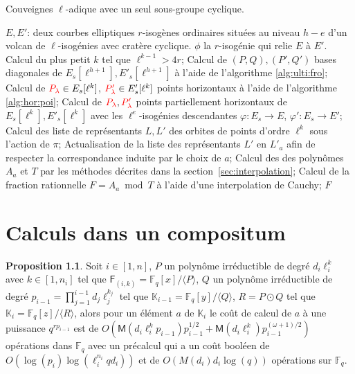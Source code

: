 \documentclass[10pt,a4paper]{book}
\theoremstyle{plain}
\theoremstyle{definition}
\theoremstyle{definition}
\theoremstyle{definition}
\newtheorem{prop}[thm]{Proposition}
\theoremstyle{definition}
\theoremstyle{remark}
\theoremstyle{remark}
\theoremstyle{definition}
\begin{document}
\begin{algorithm}
\caption{\label{alg:app:cou:var} Couveignes $\ell$-adique avec un seul sous-groupe cyclique.}
\begin{algorithmic}[1]
\REQUIRE $E,E'$: deux courbes elliptiques $r$-isogènes ordinaires situées au niveau $h-e$ d'un volcan de $\ell$-isogénies avec cratère cyclique.
\ENSURE $\phi$ la $r$-isogénie qui relie $E$ à $E'$.
\STATE Calcul du plus petit $k$ tel que $\ell^{k-1}>4r$;
\STATE  
Calcul de $(P,Q),(P',Q')$ bases diagonales de $E_s[\ell^{h+1}],E'_s[\ell^{h+1}]$ à l'aide de l'algorithme \ref{alg:ulti:fro};
\STATE Calcul de $\color{red}P_{\lambda}\color{black} \in E_s[\ell^k]$, $\color{red}P'_{\lambda}\color{black} \in E_s'[\ell^k]$ points horizontaux  à l'aide de l'algorithme \ref{alg:hor:poi};
\STATE 
Calcul de $\color{red}P_{\lambda}\color{black},\color{red}P'_{\lambda}\color{black}$ points partiellement horizontaux de $E_s[\ell^k],E'_s[\ell^k]$ avec les $\ell^e$-isogénies descendantes $\varphi: E_s \rightarrow E$, $\varphi': E_s \rightarrow E'$;
\ENDIF
\STATE Calcul des liste de représentants $L,L'$ des orbites de points d'ordre $\ell^k$ sous l'action de $\pi$;
\STATE Actualisation de la liste des représentants $L'$ en $L'_{a}$ afin de respecter la correspondance induite par le choix de $a$;
\STATE Calcul des des polynômes $A_{a}$ et $T$ par les méthodes décrites dans la section~\ref{sec:interpolation};
\STATE Calcul de la fraction rationnelle $F=A_{a} \bmod T$ à l'aide d'une interpolation de Cauchy;
\RETURN $F$
\ENDIF
\ENDFOR 
\end{algorithmic}
\end{algorithm}

\chapter{Calculs dans un compositum}
\label{cha:ann:comp}
\begin{prop}

Soit $i \in [1,n]$, $P$ un polynôme irréductible de degré $d_i\ell_i^{k}$ avec 
$k \in [1,n_i]$ tel que $\mathsf{F}_{(i,k)}=\mathbb{F}_q[x]/\langle P \rangle$,
$Q$ un polynôme irréductible de degré $p_{i-1}=\prod_{j=1}^{i-1}d_j\ell_j^{k_j}$
tel que $\mathbb{K}_{i-1}=\mathbb{F}_q[y]/\langle Q \rangle$, $R=P \odot Q$ 
tel que  $\mathbb{K}_{i}=\mathbb{F}_q[z]/\langle R\rangle$, alors pour un 
élément $a$ de $\mathbb{K}_{i}$ le coût de calcul de $a$ à une puissance 
$q^{r p_{i-1}}$ est de 
$O(\mathsf{M}(d_i\ell_i^{k}p_{i-1})p_{i-1}^{1/2}+\mathsf{M}(d_i\ell_i^{k})p_{i-1}^{(\omega+1)/2})$ 
opérations dans $\mathbb{F}_q$ avec un 
précalcul qui a un coût booléen de $O(\log(p_{i})\log(\ell_i^{n_i}qd_i))$ et  
de $O( M(d_i) d_i\log(q))$ opérations sur $\mathbb{F}_q$.
\end{prop}
\end{document}
